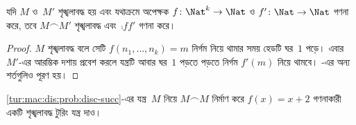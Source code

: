 \documentclass[../../../include/open-logic-section]{subfiles}
\begin{document}
\begin{ex}
\end{ex}

\begin{prop}
    যদি $M$ ও~$M'$ শৃঙ্খলাবদ্ধ হয় এবং যথাক্রমে অপেক্ষক
    $f\colon \Nat^k \to \Nat$ ও $f'\colon \Nat \to \Nat$ গণনা করে,
    তবে $M \frown M'$ শৃঙ্খলাবদ্ধ এবং~$\comp{f}{f'}$ গণনা করে।
\end{prop}

\begin{proof}
    $M$ শৃঙ্খলাবদ্ধ বলে সেটি $f(n_1,\dots,n_k) = m$ নির্গম নিয়ে থামার
    সময় হেডটি ঘর~$1$ পড়ে। এবার~$M'$-এর আরম্ভিক দশায় প্রবেশ করলে যন্ত্রটি
    আবার ঘর~$1$ পড়তে পড়তে নির্গম $f'(m)$ নিয়ে থামবে।
    -এর অন্য শর্তগুলিও পূরণ হয়।
\end{proof}

\begin{prob}
    \cref{tur:mac:dis:prob:disc-succ}-এর যন্ত্র~$M$ নিয়ে $M \frown M$
    নির্মাণ করে $f(x) = x+2$ গণনাকারী একটি শৃঙ্খলাবদ্ধ টুরিং যন্ত্র দাও।
\end{prob}
\end{document}
